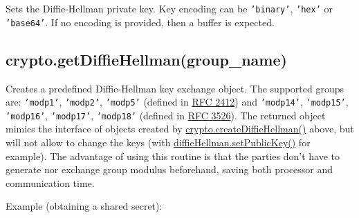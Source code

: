 Sets the Diffie-Hellman private key. Key encoding can be
\texttt{'binary'}, \texttt{'hex'} or \texttt{'base64'}. If no encoding
is provided, then a buffer is expected.

\subsection{crypto.getDiffieHellman(group\_name)}

Creates a predefined Diffie-Hellman key exchange object. The supported
groups are: \texttt{'modp1'}, \texttt{'modp2'}, \texttt{'modp5'}
(defined in \href{http://www.rfc-editor.org/rfc/rfc2412.txt}{RFC 2412})
and \texttt{'modp14'}, \texttt{'modp15'}, \texttt{'modp16'},
\texttt{'modp17'}, \texttt{'modp18'} (defined in
\href{http://www.rfc-editor.org/rfc/rfc3526.txt}{RFC 3526}). The
returned object mimics the interface of objects created by
\hyperref[crypto\_crypto\_creatediffiehellman\_prime\_encoding]{crypto.createDiffieHellman()}
above, but will not allow to change the keys (with
\hyperref[crypto\_diffiehellman\_setpublickey\_public\_key\_encoding]{diffieHellman.setPublicKey()}
for example). The advantage of using this routine is that the parties
don't have to generate nor exchange group modulus beforehand, saving
both processor and communication time.

Example (obtaining a shared secret):

\begin{Shaded}
\begin{Highlighting}[]
 \NormalTok{);}
 \NormalTok{(}\NormalTok{);}
 \NormalTok{(}\NormalTok{);}

\NormalTok{();}
\NormalTok{();}

 \NormalTok{(}\NormalTok{);}
 \NormalTok{(}\NormalTok{);}

\end{Highlighting}
\end{Shaded}


